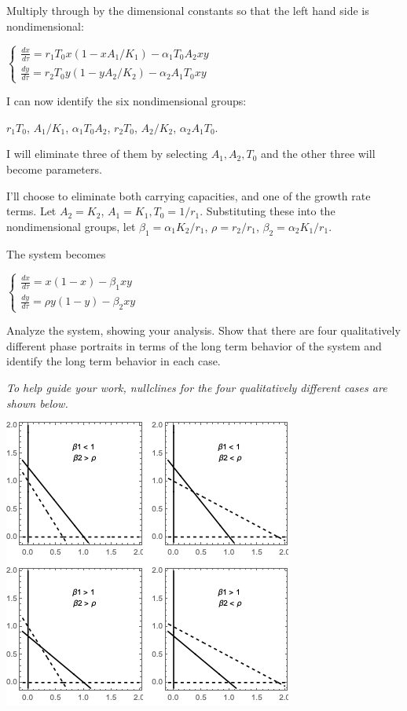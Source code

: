 \documentclass[12pt,letterpaper]{exam}
\begin{document}
\begin{questions}
\begin{parts}
\begin{solution}
Multiply through by the dimensional constants so that the left hand side is nondimensional:

$\left\{\begin{array}{l} \frac{dx}{d\tau} =  r_1T_0 x (1-x A_1/K_1) - \alpha_1 T_0 A_2 x y \\  \frac{dy}{d\tau} =  r_2 T_0 y(1-yA_2/K_2) - \alpha_2A_1 T_0 xy\end{array}\right.$

I can now identify the six nondimensional groups: 

$r_1 T_0$, $A_1/K_1$, $\alpha_1 T_0 A_2$, $r_2 T_0$, $A_2/K_2$, $\alpha_2A_1T_0$.

I will eliminate three of them by selecting $A_1, A_2, T_0$ and the other three will become parameters.

I'll choose to eliminate both carrying capacities, and one of the growth rate terms.  Let $A_2 = K_2$, $A_1 = K_1,  T_0 = 1/r_1$.  Substituting these into the nondimensional groups, let $\beta_1 = \alpha_1 K_2 / r_1$, $\rho = r_2/r_1$, $\beta_2 = \alpha_2 K_1/r_1$.


The system becomes

$\left\{\begin{array}{l} \frac{dx}{d\tau} =   x (1-x ) - \beta_1 x y \\  \frac{dy}{d\tau} =  \rho y(1-y) - \beta_2 xy\end{array}\right.$

\end{solution}

\item Analyze the system, showing your analysis.  Show that there are four qualitatively different phase portraits in terms of the long term behavior of the system and identify the long term behavior in each case.

\emph{To help guide your work, nullclines for the four qualitatively different cases are shown below.}

\includegraphics{img/PS04competition.png}


\end{parts}
\end{questions}
\end{document}
